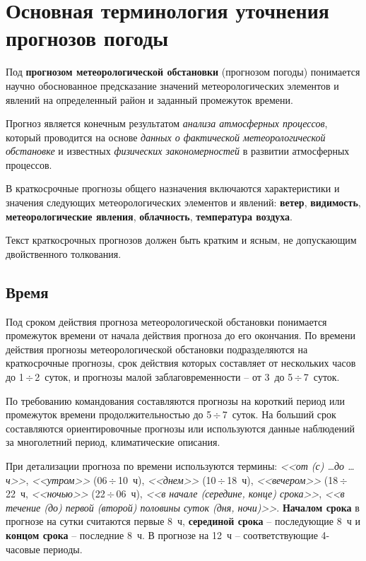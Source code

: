 \documentclass[a4paper, 12pt, twoside, final, book, russian, fittopage, cyremdash, openright]{ncc}
\newcommand{\otdo}{\,\ensuremath{\div}\,}
\begin{document}
\chapter{Основная терминология уточнения прогнозов погоды}

Под \textbf{прогнозом метеорологической обстановки} (прогнозом погоды) понимается научно обоснованное
предсказание значений метеорологических элементов и явлений на
определенный район и заданный промежуток времени.

Прогноз является конечным результатом \textit{анализа атмосферных
  процессов}, который проводится на основе \textit{данных о
  фактической метеорологической обстановке} и известных
\textit{физических закономерностей} в развитии атмосферных процессов.

В краткосрочные прогнозы общего назначения включаются характеристики и
значения следующих метеорологических элементов и явлений:
\textbf{ветер}, \textbf{видимость}, \textbf{метеорологические
  явления}, \textbf{облачность}, \textbf{температура воздуха}.

Текст краткосрочных прогнозов должен быть кратким и ясным, не
допускающим двойственного толкования.

\section{Время}
\label{sec:time}

Под сроком действия прогноза метеорологической обстановки понимается
промежуток времени от начала действия прогноза до его окончания. По
времени действия прогнозы метеорологической обстановки подразделяются
на краткосрочные прогнозы, срок действия которых составляет от
нескольких часов до 1\otdo2~суток, и прогнозы малой заблаговременности
\--- от 3~до 5\otdo7~суток.

По требованию командования составляются прогнозы на короткий период
или промежуток времени продолжительностью до 5\otdo7~суток. На больший
срок составляются ориентировочные прогнозы или используются данные
наблюдений за многолетний период, климатические описания.

При детализации прогноза по времени используются термины: \textit{<<от
  (с) \ldots до \ldots ч>>}, \textit{<<утром>>} (06\otdo10~ч),
\textit{<<днем>>} (10\otdo18~ч), \textit{<<вечером>>} (18\otdo22~ч,
\textit{<<ночью>>} (22\otdo06~ч), \textit{<<в начале (середине, конце)
  срока>>}, \textit{<<в течение (до) первой (второй) половины суток
  (дня, ночи)>>}. \textbf{Началом срока} в прогнозе на сутки считаются
первые 8~ч, \textbf{серединой срока} \--- последующие 8~ч и
\textbf{концом срока} \--- последние 8~ч. В прогнозе на 12~ч \---
соответствующие 4-часовые периоды.
\end{document}
